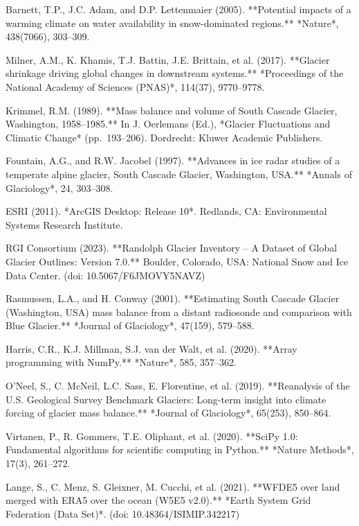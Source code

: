 \documentclass{article}
\begin{document}
\begin{thebibliography}{99}

     Barnett, T.P., J.C. Adam, and D.P. Lettenmaier (2005). **Potential impacts of a warming climate on water availability in snow-dominated regions.** *Nature*, 438(7066), 303–309.
    
     Milner, A.M., K. Khamis, T.J. Battin, J.E. Brittain, et al. (2017). **Glacier shrinkage driving global changes in downstream systems.** *Proceedings of the National Academy of Sciences (PNAS)*, 114(37), 9770–9778.
    
     Krimmel, R.M. (1989). **Mass balance and volume of South Cascade Glacier, Washington, 1958–1985.** In J. Oerlemans (Ed.), *Glacier Fluctuations and Climatic Change* (pp. 193–206). Dordrecht: Kluwer Academic Publishers.
    
     Fountain, A.G., and R.W. Jacobel (1997). **Advances in ice radar studies of a temperate alpine glacier, South Cascade Glacier, Washington, USA.** *Annals of Glaciology*, 24, 303–308.
    
     ESRI (2011). *ArcGIS Desktop: Release 10*. Redlands, CA: Environmental Systems Research Institute.
    
     RGI Consortium (2023). **Randolph Glacier Inventory – A Dataset of Global Glacier Outlines: Version 7.0.** Boulder, Colorado, USA: National Snow and Ice Data Center. (doi: 10.5067/F6JMOVY5NAVZ)
    
     Rasmussen, L.A., and H. Conway (2001). **Estimating South Cascade Glacier (Washington, USA) mass balance from a distant radiosonde and comparison with Blue Glacier.** *Journal of Glaciology*, 47(159), 579–588.
    
     Harris, C.R., K.J. Millman, S.J. van der Walt, et al. (2020). **Array programming with NumPy.** *Nature*, 585, 357–362.
    
     O’Neel, S., C. McNeil, L.C. Sass, E. Florentine, et al. (2019). **Reanalysis of the U.S. Geological Survey Benchmark Glaciers: Long-term insight into climate forcing of glacier mass balance.** *Journal of Glaciology*, 65(253), 850–864.
    
     Virtanen, P., R. Gommers, T.E. Oliphant, et al. (2020). **SciPy 1.0: Fundamental algorithms for scientific computing in Python.** *Nature Methods*, 17(3), 261–272.
    
     Lange, S., C. Menz, S. Gleixner, M. Cucchi, et al. (2021). **WFDE5 over land merged with ERA5 over the ocean (W5E5 v2.0).** *Earth System Grid Federation (Data Set)*. (doi: 10.48364/ISIMIP.342217)
   

\end{thebibliography}
\end{document}

